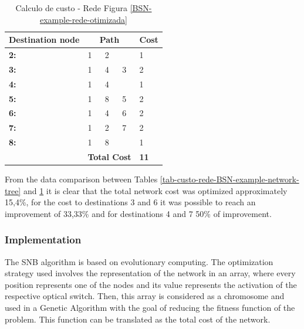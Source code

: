 \documentclass[conference]{IEEEtran}
\begin{document}
\begin{table}[t!]
	\centering
			\begin{tabular}{lllll}
			\hline
			\multicolumn{1}{|l|}{\textbf{Destination node}} & \multicolumn{3}{c}{\textbf{Path}} & \multicolumn{1}{c|}{\textbf{Cost}} \\ \hline
			\multicolumn{1}{|l|}{\textbf{2:}} & 1 & 2 & \multicolumn{1}{l|}{} & \multicolumn{1}{l|}{1} \\ \hline
			\multicolumn{1}{|l|}{\textbf{3:}} & 1 & 4 & \multicolumn{1}{l|}{3} & \multicolumn{1}{l|}{2} \\ \hline
			\multicolumn{1}{|l|}{\textbf{4:}} & 1 & 4 & \multicolumn{1}{l|}{} & \multicolumn{1}{l|}{1} \\ \hline
			\multicolumn{1}{|l|}{\textbf{5:}} & 1 & 8 & \multicolumn{1}{l|}{5} & \multicolumn{1}{l|}{2} \\ \hline
			\multicolumn{1}{|l|}{\textbf{6:}} & 1 & 4 & \multicolumn{1}{l|}{6} & \multicolumn{1}{l|}{2} \\ \hline
			\multicolumn{1}{|l|}{\textbf{7:}} & 1 & 2 & \multicolumn{1}{l|}{7} & \multicolumn{1}{l|}{2} \\ \hline
			\multicolumn{1}{|l|}{\textbf{8:}} & 1 & 8 & \multicolumn{1}{l|}{} & \multicolumn{1}{l|}{1} \\ \hline
			 & \multicolumn{3}{l}{\textbf{Total Cost}} & \textbf{11}
			\end{tabular}
	\caption{Calculo de custo - Rede Figura \ref{BSN-example-rede-otimizada}}
	\label{tab-custo-rede-bsn-otimizada}
	\label{tab_calc_custo}
\end{table}

From the data comparison between Tables \ref{tab-custo-rede-BSN-example-network-tree} and \ref{tab_calc_custo} it is clear that the total network cost was optimized approximately 15,4\%, for the cost to destinations 3 and 6 it was possible to reach an improvement of 33,33\% and for destinations 4 and 7 50\% of improvement.

\subsubsection{Implementation}
The SNB algorithm is based on evolutionary computing. The optimization strategy used involves the representation of the network in an array, where every position represents one of the nodes and its value represents the activation of the respective optical switch. Then, this array is considered as a chromosome and used in a Genetic Algorithm with the goal of reducing the fitness function of the problem. This function can be translated as the total cost of the network.
\end{document}
